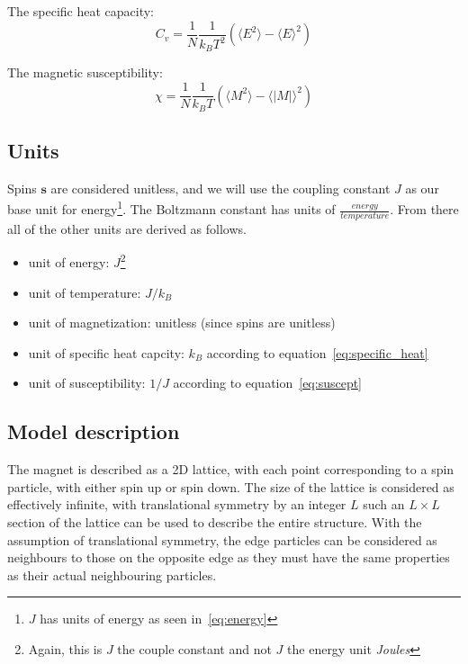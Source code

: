 \documentclass[english,notitlepage,reprint,nofootinbib]{revtex4-1}  %
\begin{document}
The specific heat capacity:
\begin{equation}\label{eq:specific_heat}
    C_v = \frac{1}{N} \frac{1}{k_BT^2} (\langle E^2 \rangle - \langle E \rangle ^2)
\end{equation}

The magnetic susceptibility:
\begin{equation}\label{eq:suscept}
    \chi = \frac{1}{N} \frac{1}{k_B T}(\langle M^2 \rangle - \langle |M| \rangle^2 )
\end{equation}

\subsection{Units}\label{sub:units}
Spins $ \mathbf{s}  $ are considered unitless, and we will use the coupling constant $ J $  as our base unit for energy\footnote{$J$ has units of energy as seen in~\ref{eq:energy}}. The Boltzmann constant has units of $ \frac{energy}{temperature} $. From there all of the other units are derived as follows.
\begin{itemize}
	\item unit of energy: $ J $\footnote{Again, this is $J$ the couple constant and not $J$ the energy unit \textit{Joules}}
	\item unit of temperature: $ J/k_B $
	\item unit of magnetization: unitless (since spins are unitless)
        \item unit of specific heat capcity: $k_B$ according to equation~\eqref{eq:specific_heat}
        \item unit of susceptibility: $ 1/J $ according to equation~\eqref{eq:suscept}
\end{itemize}

\subsection{Model description}\label{sub:model_desc}
The magnet is described as a 2D lattice, with each point corresponding to a spin particle, with either spin up or spin down. The size of the lattice is considered as effectively infinite, with translational symmetry by an integer $L$ such an $L\times L$ section of the lattice can be used to describe the entire structure. With the assumption of translational symmetry, the edge particles can be considered as neighbours to those on the opposite edge as they must have the same properties as their actual neighbouring particles. 
\end{document}
